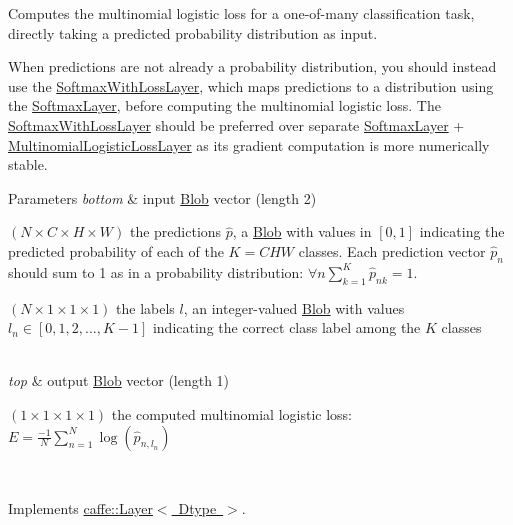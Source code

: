 Computes the multinomial logistic loss for a one-\/of-\/many classification task, directly taking a predicted probability distribution as input. 

When predictions are not already a probability distribution, you should instead use the \mbox{\hyperlink{classcaffe_1_1_softmax_with_loss_layer}{Softmax\+With\+Loss\+Layer}}, which maps predictions to a distribution using the \mbox{\hyperlink{classcaffe_1_1_softmax_layer}{Softmax\+Layer}}, before computing the multinomial logistic loss. The \mbox{\hyperlink{classcaffe_1_1_softmax_with_loss_layer}{Softmax\+With\+Loss\+Layer}} should be preferred over separate \mbox{\hyperlink{classcaffe_1_1_softmax_layer}{Softmax\+Layer}} + \mbox{\hyperlink{classcaffe_1_1_multinomial_logistic_loss_layer}{Multinomial\+Logistic\+Loss\+Layer}} as its gradient computation is more numerically stable.


\begin{DoxyParams}{Parameters}
{\em bottom} & input \mbox{\hyperlink{classcaffe_1_1_blob}{Blob}} vector (length 2)
\begin{DoxyEnumerate}
\item $ (N \times C \times H \times W) $ the predictions $ \hat{p} $, a \mbox{\hyperlink{classcaffe_1_1_blob}{Blob}} with values in $ [0, 1] $ indicating the predicted probability of each of the $ K = CHW $ classes. Each prediction vector $ \hat{p}_n $ should sum to 1 as in a probability distribution\+: $ \forall n \sum\limits_{k=1}^K \hat{p}_{nk} = 1 $.
\item $ (N \times 1 \times 1 \times 1) $ the labels $ l $, an integer-\/valued \mbox{\hyperlink{classcaffe_1_1_blob}{Blob}} with values $ l_n \in [0, 1, 2, ..., K - 1] $ indicating the correct class label among the $ K $ classes 
\end{DoxyEnumerate}\\
\hline
{\em top} & output \mbox{\hyperlink{classcaffe_1_1_blob}{Blob}} vector (length 1)
\begin{DoxyEnumerate}
\item $ (1 \times 1 \times 1 \times 1) $ the computed multinomial logistic loss\+: $ E = \frac{-1}{N} \sum\limits_{n=1}^N \log(\hat{p}_{n,l_n}) $ 
\end{DoxyEnumerate}\\
\hline
\end{DoxyParams}


Implements \mbox{\hyperlink{classcaffe_1_1_layer_a576ac6a60b1e99fe383831f52a6cea77}{caffe\+::\+Layer$<$ Dtype $>$}}.


